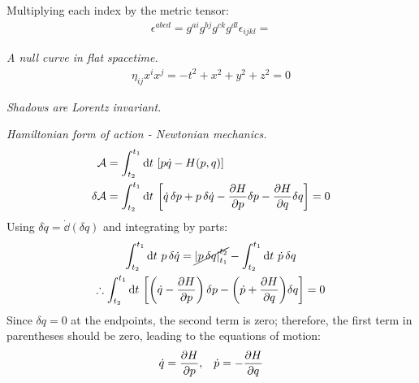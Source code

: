 \documentclass{report}
\begin{document}
\begin{subquests}
\begin{subquests}
		\item Multiplying each index by the metric tensor:
		\begin{gather*}
			\epsilon^{abcd} = g^{ai}g^{bj}g^{ck}g^{dl}\epsilon_{ijkl} = 
		\end{gather*}

		\item

		\item
	\end{subquests}
	\item \emph{A null curve in flat spacetime.}
	\begin{align*}
		\eta_{ij}x^{i}x^{j} = -t^2 + x^2 + y^2 + z^2 = 0 
	\end{align*}

	\item \emph{Shadows are Lorentz invariant.}

	\item \emph{Hamiltonian form of action - Newtonian mechanics.}
	\begin{align*}
		\mathcal A & = \int_{t_2}^{t_1}\dd{t}\,\bqty{p\dot q - H(p,q)} \\
		\delta\mathcal A & = \int_{t_2}^{t_1} \dd{t}\, \bqty{\dot q\,\delta p + p\,\delta\dot q  - \pdv{H}{p}\delta p - \pdv{H}{q}\delta q} = 0
	\end{align*}
	Using $\delta\dot q = \dot\dd(\delta q)$ and integrating by parts:
	\begin{gather*}
		\int_{t_2}^{t_1} \dd{t}\, p\,\delta \dot q = \cancel{\left|p\,\delta q\right|_{t_1}^{t_2}} - \int_{t_2}^{t_1} \dd{t}\,\dot p\, \delta q  \\
		\therefore \int_{t_2}^{t_1} \dd{t}\, \bqty{\pqty{\dot q -\pdv{H}{p}}\,\delta p - \pqty{\dot p + \pdv{H}{q}}\delta q} = 0
	\end{gather*}
	Since $\delta q = 0 $ at the endpoints, the second term is zero; therefore, the first term in parentheses should be zero, leading to the equations of motion:
	\begin{align*}
		\dot q = \pdv{H}{p},\;\;\;\dot p = -\pdv{H}{q} 	
	\end{align*} 
	

\end{subquests}
\end{document}
